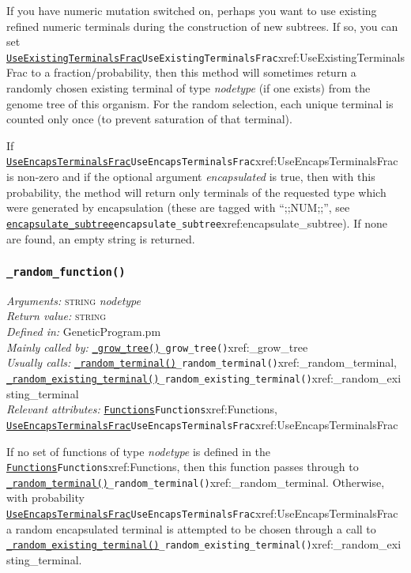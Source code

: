 \documentclass[a4paper]{article}
\begin{document}
If you have numeric mutation switched on, perhaps you want to use
existing refined numeric terminals during the construction of new
subtrees.  If so, you can set \hyperref[no]{\texttt{UseExistingTerminalsFrac}}{\texttt{UseExistingTerminalsFrac}}{xref:UseExistingTerminalsFrac} to a
fraction/probability, then this method will sometimes return a
randomly chosen existing terminal of type \textit{nodetype} (if one
exists) from the genome tree of this organism.  For the random
selection, each unique terminal is counted only once (to prevent
saturation of that terminal).

If \hyperref[no]{\texttt{UseEncapsTerminalsFrac}}{\texttt{UseEncapsTerminalsFrac}}{xref:UseEncapsTerminalsFrac} is non-zero and if the optional
argument \textit{encapsulated} is true, then with this probability,
the method will return only terminals of the requested type which were
generated by encapsulation (these are tagged with ``;;NUM;;'', see
\hyperref[no]{\texttt{encapsulate\_subtree}}{\texttt{encapsulate\_subtree}}{xref:encapsulate_subtree}).  If none are found, an empty string is
returned.

\subsubsection{\texttt{\_random\_function()}}\label{xref:_random_function}
\begin{flushleft}
\textit{Arguments:} \textsc{string} \textit{nodetype}\\
\textit{Return value:} \textsc{string}\\
\textit{Defined in:} GeneticProgram.pm\\
\textit{Mainly called by:} \hyperref[no]{\texttt{\_grow\_tree()}}{\texttt{\_grow\_tree()}}{xref:_grow_tree}\\
\textit{Usually calls:} \hyperref[no]{\texttt{\_random\_terminal()}}{\texttt{\_random\_terminal()}}{xref:_random_terminal}, \hyperref[no]{\texttt{\_random\_existing\_terminal()}}{\texttt{\_random\_existing\_terminal()}}{xref:_random_existing_terminal}\\
\textit{Relevant attributes:} \hyperref[no]{\texttt{Functions}}{\texttt{Functions}}{xref:Functions}, \hyperref[no]{\texttt{UseEncapsTerminalsFrac}}{\texttt{UseEncapsTerminalsFrac}}{xref:UseEncapsTerminalsFrac}
\end{flushleft}

If no set of functions of type \textit{nodetype} is defined in the
\hyperref[no]{\texttt{Functions}}{\texttt{Functions}}{xref:Functions}, then this function passes through to
\hyperref[no]{\texttt{\_random\_terminal()}}{\texttt{\_random\_terminal()}}{xref:_random_terminal}.  Otherwise, with probability
\hyperref[no]{\texttt{UseEncapsTerminalsFrac}}{\texttt{UseEncapsTerminalsFrac}}{xref:UseEncapsTerminalsFrac} a random encapsulated terminal is
attempted to be chosen through a call to
\hyperref[no]{\texttt{\_random\_existing\_terminal()}}{\texttt{\_random\_existing\_terminal()}}{xref:_random_existing_terminal}.
\end{document}
